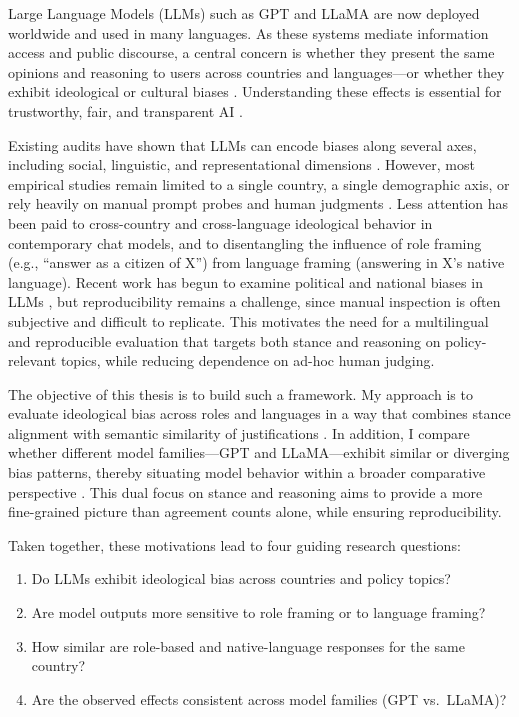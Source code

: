 
Large Language Models (LLMs) such as GPT \cite{openai_gpt4_2023} and LLaMA \cite{touvron_llama_2023} are now deployed worldwide and used in many languages. As these systems mediate information access and public discourse, a central concern is whether they present the same opinions and reasoning to users across countries and languages—or whether they exhibit ideological or cultural biases \cite{weidinger_risks_2021,pmlr-v202-santurkar23a}. Understanding these effects is essential for trustworthy, fair, and transparent AI \cite{navigating-llm-ethics}.

Existing audits have shown that LLMs can encode biases along several axes, including social, linguistic, and representational dimensions \cite{kurita2019bias,stereoset2021,detecting2023}. However, most empirical studies remain limited to a single country, a single demographic axis, or rely heavily on manual prompt probes and human judgments \cite{gender_gpt2023}. Less attention has been paid to cross-country and cross-language ideological behavior in contemporary chat models, and to disentangling the influence of role framing (e.g., “answer as a citizen of X”) from language framing (answering in X’s native language). Recent work has begun to examine political and national biases in LLMs \cite{silence_llms2023,nationality_bias2013,russia_china_war2024}, but reproducibility remains a challenge, since manual inspection is often subjective and difficult to replicate. This motivates the need for a multilingual and reproducible evaluation that targets both stance and reasoning on policy-relevant topics, while reducing dependence on ad-hoc human judging.

The objective of this thesis is to build such a framework. My approach is to evaluate ideological bias across roles and languages in a way that combines stance alignment with semantic similarity of justifications \cite{detecting2023}. In addition, I compare whether different model families—GPT and LLaMA—exhibit similar or diverging bias patterns, thereby situating model behavior within a broader comparative perspective \cite{silence_llms2023}. This dual focus on stance and reasoning aims to provide a more fine-grained picture than agreement counts alone, while ensuring reproducibility.

Taken together, these motivations lead to four guiding research questions:
\begin{enumerate}
    \item Do LLMs exhibit ideological bias across countries and policy topics?
    \item Are model outputs more sensitive to role framing or to language framing?
    \item How similar are role-based and native-language responses for the same country?
    \item Are the observed effects consistent across model families (GPT vs.\ LLaMA)?
\end{enumerate}

